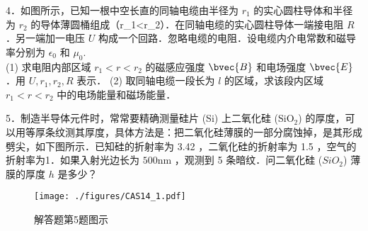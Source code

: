 4．如图所示，已知一根中空长直的同轴电缆由半径为 $r_1$ 的实心圆柱导体和半径为 $r_2$ 的导体薄圆桶组成（r_1<r_2）．在同轴电缆的实心圆柱导体一端接电阻 $R$．另一端加一电压 $U$ 构成一个回路．忽略电缆的电阻．设电缆内介电常数和磁导率分别为 $\epsilon_0$ 和 $\mu_0$.\\
(1) 求电阻内部区域 $r_1<r<r_2$ 的磁感应强度 $\bvec{B}$ 和电场强度 $\bvec{E}$．用 $U,r_1,r_2,R$ 表示．
(2) 取同轴电缆一段长为 $l$ 的区域，求该段内区域 $r_1<r<r_2$ 中的电场能量和磁场能量．


5．制造半导体元件时，常常要精确测量硅片 (Si) 上二氧化硅 ($\mathrm{SiO_2}$) 的厚度，可以用等厚条纹测其厚度，具体方法是：把二氧化硅薄膜的一部分腐蚀掉，是其形成劈尖，如下图所示．已知硅的折射率为 3.42 ，二氧化硅的折射率为 1.5 ，空气的折射率为1．如果入射光边长为 $500\mathrm{nm}$ ，观测到 5 条暗纹．问二氧化硅 ($SiO_2$) 薄膜的厚度 $h$ 是多少？
\begin{figure}[ht]
\centering
\texttt{[image: ./figures/CAS14\_1.pdf]}
\caption{解答题第5题图示} \label{CAS14_fig1}
\end{figure}